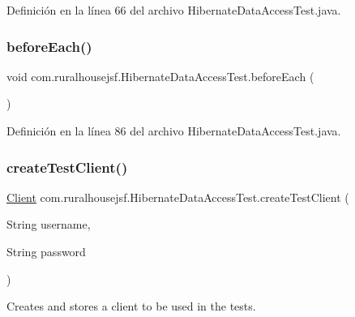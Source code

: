 Definición en la línea 66 del archivo Hibernate\+Data\+Access\+Test.\+java.

\mbox{\label{classcom_1_1ruralhousejsf_1_1_hibernate_data_access_test_a45f50c1176ffaef90f33dccb27e03cdd}} 
\subsubsection{\texorpdfstring{beforeEach()}{beforeEach()}}
{\footnotesize\ttfamily void com.\+ruralhousejsf.\+Hibernate\+Data\+Access\+Test.\+before\+Each (\begin{DoxyParamCaption}{ }\end{DoxyParamCaption})\hspace{0.3cm}{\ttfamily [package]}}



Definición en la línea 86 del archivo Hibernate\+Data\+Access\+Test.\+java.

\mbox{\label{classcom_1_1ruralhousejsf_1_1_hibernate_data_access_test_a971c94d6c41317c2cc8de024153f0dc9}} 
\subsubsection{\texorpdfstring{createTestClient()}{createTestClient()}}
{\footnotesize\ttfamily \mbox{\hyperlink{classcom_1_1ruralhousejsf_1_1domain_1_1_client}{Client}} com.\+ruralhousejsf.\+Hibernate\+Data\+Access\+Test.\+create\+Test\+Client (\begin{DoxyParamCaption}\item[{String}]{username,  }\item[{String}]{password }\end{DoxyParamCaption})\hspace{0.3cm}{\ttfamily [private]}}



Creates and stores a client to be used in the tests. 

